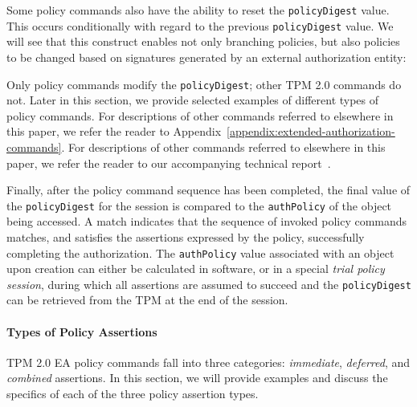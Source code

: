 \documentclass{sig-alternate-2013}
\def\istechreport{1}
\begin{document}
Some policy commands also have the ability to reset the \texttt{policyDigest}
value. This occurs conditionally with regard to the previous
\texttt{policyDigest} value. We will see that this construct enables not only
branching policies, but also policies to be changed based on signatures
generated by an external authorization entity:

\vspace{.5\baselineskip}
\noindent
{}
\vspace{.5\baselineskip}

Only policy commands modify the \texttt{policyDigest}; other TPM 2.0 commands do
not. Later in this section, we provide selected examples of different types of
policy commands. \ifdefined\istechreport For descriptions of other commands
referred to elsewhere in this paper, we refer the reader to
Appendix~\ref{appendix:extended-authorization-commands}. \else For descriptions
of other commands referred to elsewhere in this paper, we refer the reader to
our accompanying technical report~\cite{Nyman14}.
\fi

Finally, after the policy command sequence has been completed, the final value
of the \texttt{policyDigest} for the session is compared to the
\texttt{authPolicy} of the object being accessed. A match indicates that the
sequence of invoked policy commands matches, and satisfies the assertions
expressed by the policy, successfully completing the authorization. The
\texttt{authPolicy} value associated with an object upon creation can either be
calculated in software, or in a special \emph{trial policy session}, during
which all assertions are assumed to succeed and the \texttt{policyDigest} can be
retrieved from the TPM at the end of the session.

\paragraph{Types of Policy Assertions}

TPM 2.0 EA policy commands fall into three categories: \emph{immediate},
\emph{deferred}, and \emph{combined} assertions. In this section, we will
provide examples and discuss the specifics of each of the three policy
assertion types.
\end{document}
